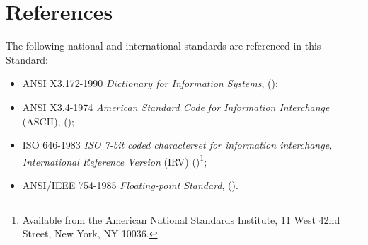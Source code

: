 \section{References}

The following national and international standards are referenced
in this Standard:

\begin{itemize}
\item ANSI X3.172-1990 \textit{Dictionary for Information Systems},
	();

\item ANSI X3.4-1974 \textit{American Standard Code for Information
	Interchange} (ASCII),
	();

\item ISO 646-1983 \textit{ISO 7-bit coded characterset for
	information interchange, International Reference Version} (IRV)
	()\footnote{Available from
	the American National Standards Institute, 11 West 42nd Street,
	New York, NY 10036.};

\item ANSI/IEEE 754-1985 \textit{Floating-point Standard},
	().
\end{itemize}

